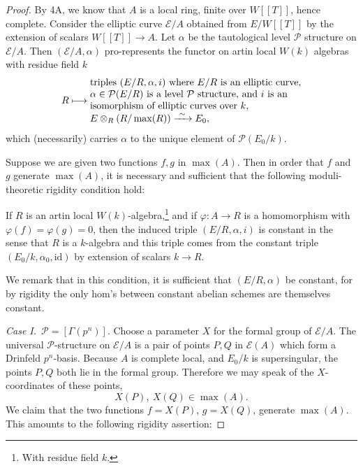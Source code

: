 \begin{proof}
By 4A, we know that $A$ is a local ring, finite over $W[[T]]$, hence complete. Consider the elliptic curve $\mathcal{E}/A$ obtained from $E/W[[T]]$ by the extension of scalars $W[[T]] \to A$. Let $\alpha$ be the tautological level $\mathcal{P}$ structure on $\mathcal{E}/A$. Then $(\mathcal{E}/A, \alpha)$ pro-represents the functor on artin local $W(k)$ algebras with residue field $k$
\[
R \longmapsto
\begin{array}{@{}l@{}}
\text{triples } (E/R, \alpha, i) \text{ where } E/R \text{ is an elliptic curve,} \\
\alpha \in \mathcal{P}(E/R) \text{ is a level } \mathcal{P} \text{ structure, and } i \text{ is an} \\
\text{isomorphism of elliptic curves over } k, \\
E\otimes_R (R/\max(R)) \xrightarrow{\ \sim\ } E_0,
\end{array}
\]
which (necessarily) carries $\alpha$ to the unique element of $\mathcal{P}(E_0/k)$.

Suppose we are given two functions $f, g$ in $\max(A)$. Then in order that $f$ and $g$ generate $\max(A)$, it is necessary and sufficient that the following moduli-theoretic rigidity condition hold:

\smallskip
\noindent If $R$ is an artin local $W(k)$-algebra,\footnote{With residue field $k$.} and if $\varphi : A \to R$ is a homomorphism with $\varphi(f) = \varphi(g) = 0$, then the induced triple $(E/R, \alpha, i)$ is constant in the sense that $R$ is a $k$-algebra and this triple comes from the constant triple $(E_0/k, \alpha_0, \mathrm{id})$ by extension of scalars $k \to R$.
\smallskip

We remark that in this condition, it is sufficient that $(E/R, \alpha)$ be constant, for by rigidity the only hom's between constant abelian schemes are themselves constant.

\medskip
\noindent\emph{Case I.}\ $\mathcal{P} = [\Gamma(p^n)]$. Choose a parameter $X$ for the formal group of $\mathcal{E}/A$. The universal $\mathcal{P}$-structure on $\mathcal{E}/A$ is a pair of points $P, Q$ in $\mathcal{E}(A)$ which form a Drinfeld $p^n$-basis. Because $A$ is complete local, and $E_0/k$ is supersingular, the points $P, Q$ both lie in the formal group. Therefore we may speak of the $X$-coordinates of these points,
\[
X(P),\ X(Q) \in \max(A).
\]
We claim that the two functions $f = X(P)$, $g = X(Q)$, generate $\max(A)$. This amounts to the following rigidity assertion:


\end{proof}
